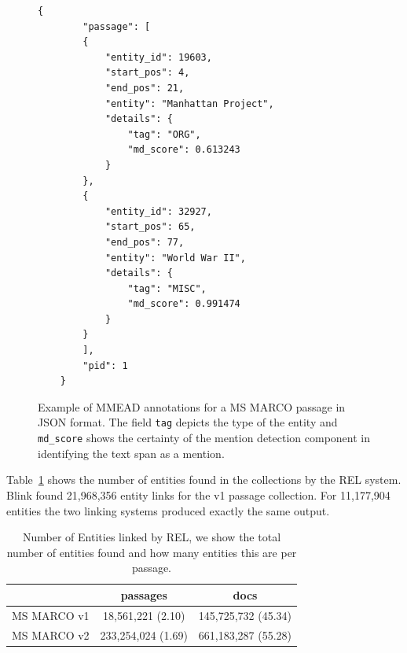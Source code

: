 \begin{figure}[t]
\begin{lstlisting}[frame=single, numbers=none]
	{
		"passage": [
		{
			"entity_id": 19603, 
			"start_pos": 4, 
			"end_pos": 21,
			"entity": "Manhattan Project",
			"details": {
				"tag": "ORG",
				"md_score": 0.613243
			}
		}, 
		{
			"entity_id": 32927,
			"start_pos": 65,
			"end_pos": 77,
			"entity": "World War II",
			"details": {
				"tag": "MISC",
				"md_score": 0.991474
			}
		}
		], 
		"pid": 1
	}
\end{lstlisting}
\caption{Example of MMEAD annotations for a MS MARCO passage in JSON format. The field \texttt{tag} depicts the type of the entity and \texttt{md\_score} shows the certainty of the mention detection component in identifying the text span as a mention.}
\label{fig:json-example-passage-v1}
\end{figure}

Table~\ref{number-links} shows the number of entities found in the collections by the REL system. Blink found 21,968,356 entity links for the v1 passage collection.  For 11,177,904 entities the two linking systems produced exactly the same output. 

\begin{table}[t]
\centering
\caption{Number of Entities linked by REL, we show the total number of entities found and how many entities this are per passage.}
\begin{tabular}{c|c|c}
\toprule
& passages & docs \\
\midrule
MS MARCO v1 & 18,561,221 (2.10) & 145,725,732 (45.34) \\
MS MARCO v2 & 233,254,024 (1.69) & 661,183,287 (55.28) \\
\bottomrule
\end{tabular}
\label{number-links}
\end{table}

